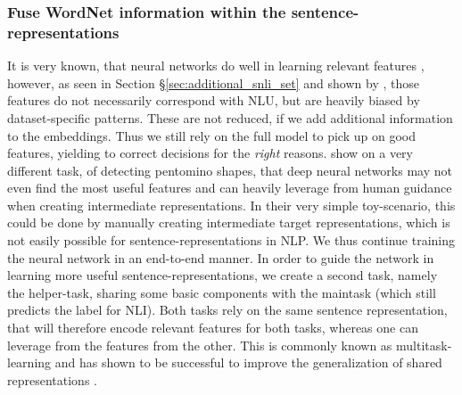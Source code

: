 \subsubsection{Fuse WordNet information within the sentence-representations}\label{sec:mt_learning_intro}
It is very known, that neural networks do well in learning relevant features \citep{bengio2013representation}, however, as seen in Section §\ref{sec:additional_snli_set} and shown by \cite{gururangan2018annotation}, those features do not necessarily correspond with \ac{NLU}, but are heavily biased by dataset-specific patterns. These are not reduced, if we add additional information to the embeddings. Thus we still rely on the full model to pick up on good features, yielding to correct decisions for the \textit{right} reasons. \cite{gulccehre2016knowledge} show on a very different task, of detecting pentomino shapes, that deep neural networks may not even find the most useful features and can heavily leverage from human guidance when creating intermediate representations. In their very simple toy-scenario, this could be done by manually creating intermediate target representations, which is not easily possible for sentence-representations in \ac{NLP}. We thus continue training the neural network in an end-to-end manner. In order to guide the network in learning more useful sentence-representations, we create a second task, namely the helper-task, sharing some basic components with the maintask (which still predicts the label for \ac{NLI}). Both tasks rely on the same sentence representation, that will therefore encode relevant features for both tasks, whereas one can leverage from the features from the other. This is commonly known as multitask-learning and has shown to be successful to improve the generalization of shared representations \citep{nangia2017repeval}.
